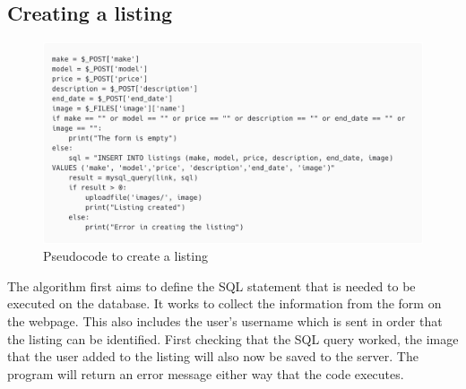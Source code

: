 \subsection{Creating a listing}
\begin{figure}[H]
    \centering
    \includegraphics[scale=0.3]{ch2_design/alg_creating.png}
    \caption{Pseudocode to create a listing}
    \label{fig:alg_creating}
\end{figure}
The algorithm first aims to define the SQL statement that is needed to be executed on the database. It works to collect the information from the form on the webpage. This also includes the user’s username which is sent in order that the listing can be identified. First checking that the SQL query worked, the image that the user added to the listing will also now be saved to the server. The program will return an error message either way that the code executes. 

